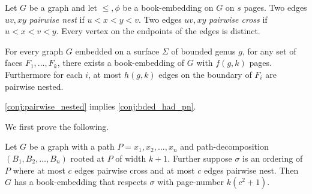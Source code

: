 


Let $G$ be a graph and let $\leq, \phi$ be a book-embedding on $G$ on $s$ pages. Two edges $uv, xy$ \textit{pairwise nest} if $u < x < y < v$. Two edges $uv, xy$ \textit{pairwise cross} if $u < x < v < y$. Every vertex on the endpoints of the edges is distinct.

\begin{conjecture}\label{conj:pairwise_nested}
    For every graph $G$ embedded on a surface $\Sigma$ of bounded genus $g$, for any set of faces $F_1, \ldots, F_k$, there exists a book-embedding of $G$ with $f(g, k)$ pages. Furthermore for each $i$, at most $h(g, k)$ edges on the boundary of $F_i$ are pairwise nested. 
\end{conjecture}

\cref{conj:pairwise_nested} implies \cref{conj:bded_had_pn}. 

We first prove the following.
\begin{proposition}\label{prop:nested_edges}
    Let $G$ be a graph with a path $P = x_1, x_2, \ldots, x_n$ and  path-decomposition $(B_1, B_2, \ldots, B_n)$ rooted at $P$ of width $k + 1$. Further suppose $\sigma$ is an ordering of $P$ where at most $c$ edges pairwise cross and at most $c$ edges pairwise nest. Then $G$ has a book-embedding that respects $\sigma$ with page-number $k(c^2 + 1)$.
\end{proposition}

